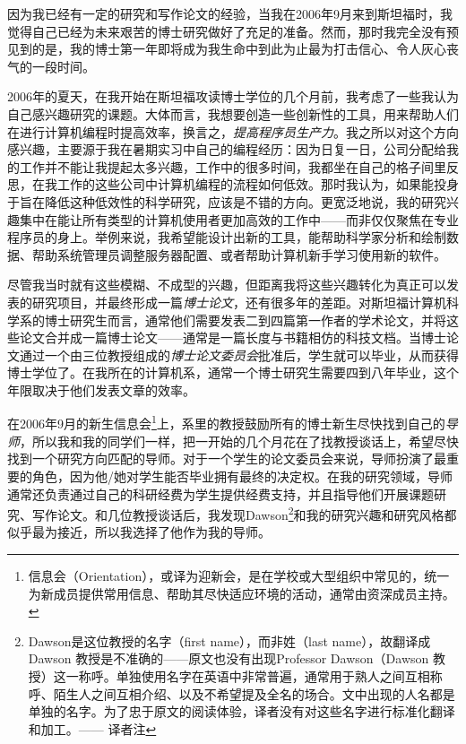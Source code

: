 \documentclass[12pt,UTF8,nofonts]{book}
\begin{document}
因为我已经有一定的研究和写作论文的经验，当我在2006年9月来到斯坦福时，我觉得自己已经为未来艰苦的博士研究做好了充足的准备。然而，那时我完全没有预见到的是，我的博士第一年即将成为我生命中到此为止最为打击信心、令人灰心丧气的一段时间。



2006年的夏天，在我开始在斯坦福攻读博士学位的几个月前，我考虑了一些我认为自己感兴趣研究的课题。大体而言，我想要创造一些创新性的工具，用来帮助人们在进行计算机编程时提高效率，换言之，\emph{提高程序员生产力}。我之所以对这个方向感兴趣，主要源于我在暑期实习中自己的编程经历：因为日复一日，公司分配给我的工作并不能让我提起太多兴趣，工作中的很多时间，我都坐在自己的格子间里反思，在我工作的这些公司中计算机编程的流程如何低效。那时我认为，如果能投身于旨在降低这种低效性的科学研究，应该是不错的方向。更宽泛地说，我的研究兴趣集中在能让所有类型的计算机使用者更加高效的工作中——而非仅仅聚焦在专业程序员的身上。举例来说，我希望能设计出新的工具，能帮助科学家分析和绘制数据、帮助系统管理员调整服务器配置、或者帮助计算机新手学习使用新的软件。

尽管我当时就有这些模糊、不成型的兴趣，但距离我将这些兴趣转化为真正可以发表的研究项目，并最终形成一篇\emph{博士论文}，还有很多年的差距。对斯坦福计算机科学系的博士研究生而言，通常他们需要发表二到四篇第一作者的学术论文，并将这些论文合并成一篇博士论文——通常是一篇长度与书籍相仿的科技文档。当博士论文通过一个由三位教授组成的\emph{博士论文委员会}批准后，学生就可以毕业，从而获得博士学位了。在我所在的计算机系，通常一个博士研究生需要四到八年毕业，这个年限取决于他们发表文章的效率。

在2006年9月的新生信息会\footnote{信息会（Orientation），或译为迎新会，是在学校或大型组织中常见的，统一为新成员提供常用信息、帮助其尽快适应环境的活动，通常由资深成员主持。}上，系里的教授鼓励所有的博士新生尽快找到自己的\emph{导师}，所以我和我的同学们一样，把一开始的几个月花在了找教授谈话上，希望尽快找到一个研究方向匹配的导师。对于一个学生的论文委员会来说，导师扮演了最重要的角色，因为他/她对学生能否毕业拥有最终的决定权。在我的研究领域，导师通常还负责通过自己的科研经费为学生提供经费支持，并且指导他们开展课题研究、写作论文。和几位教授谈话后，我发现Dawson\footnote{Dawson是这位教授的名字（first name），而非姓（last name），故翻译成Dawson 教授是不准确的——原文也没有出现Professor Dawson（Dawson 教授）这一称呼。单独使用名字在英语中非常普遍，通常用于熟人之间互相称呼、陌生人之间互相介绍、以及不希望提及全名的场合。文中出现的人名都是单独的名字。为了忠于原文的阅读体验，译者没有对这些名字进行标准化翻译和加工。—— 译者注}和我的研究兴趣和研究风格都似乎最为接近，所以我选择了他作为我的导师。
\end{document}
